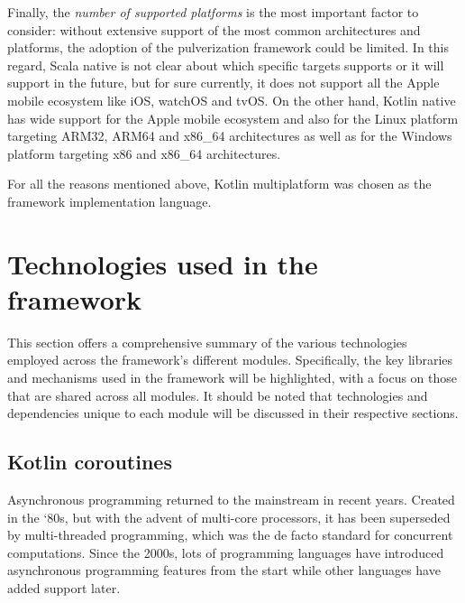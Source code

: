Finally, the \emph{number of supported platforms} is the most important factor to consider: without extensive support of the most common
architectures and platforms, the adoption of the pulverization framework could be limited.
In this regard, Scala native is not clear about which specific targets supports or it will support in the future, but for sure currently, it does not
support all the Apple mobile ecosystem like iOS, watchOS and tvOS. On the other hand, Kotlin native has wide support for the Apple mobile ecosystem
and also for the Linux platform targeting ARM32, ARM64 and x86\_64 architectures as well as for the Windows platform targeting x86 and x86\_64
architectures.

For all the reasons mentioned above, Kotlin multiplatform was chosen as the framework implementation language.

\section{Technologies used in the framework}

This section offers a comprehensive summary of the various technologies employed across the framework's different modules. Specifically, the key
libraries and mechanisms used in the framework will be highlighted, with a focus on those that are shared across all modules. It should be noted that
technologies and dependencies unique to each module will be discussed in their respective sections.

\subsection{Kotlin coroutines}

Asynchronous programming returned to the mainstream in recent years. Created in the `80s, but with the advent of multi-core processors, it has been
superseded by multi-threaded programming, which was the de facto standard for concurrent computations.
Since the 2000s, lots of programming languages have introduced asynchronous programming features from the start while other languages have added
support later.


